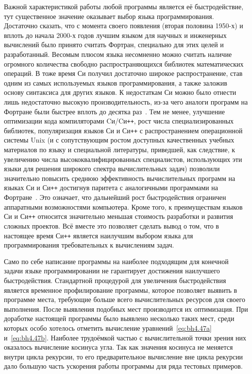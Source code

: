 Важной характеристикой работы любой программы является её
быстродействие, тут существенное значение оказывает выбор языка
программирования.  Достаточно сказать, что с момента своего появления
(вторая половина 1950-х) и вплоть до начала 2000-х годов лучшим языком
для научных и инженерных вычислений было принято считать Фортран,
специально для этих целей и разработанный. Весомым плюсом языка
несомненно можно считать наличие огромного количества свободно
распространяющихся библиотек математических операций. В тоже время Си
получил достаточно широкое распространение, став одним из самых
используемых языков программирования, а также заложив основу
синтаксиса для других языков. К недостаткам Си можно было отнести лишь
недостаточно высокую производительность, из-за чего аналоги программ
на Фортране были быстрее вплоть до десятка
раз~\cite{Veldhuizen-1997}. Тем не менее, улучшение оптимизации кода
компиляторами Cи/Cи\texttt{++}, рост числа специализированных
библиотек, популяризация языков Си и Си\texttt{++} с распространением
операционной системы Unix (и с сопутствующим ростом доступных
качественных учебных материалов по языку и специальной литературы,
приведшей, как следствие, к увеличению числа высококвалифицированных
специалистов, использующих эти языки для решения широкого спектра
вычислительных задач) позволили значительно повысить среднюю
эффективность вычислительных программ на языках Си и Си\texttt{++}
достигнув паритета с аналогичными программами на
Фортране~\cite{Veldhuizen-1997,Markovich-FDTD-2013}.  Это означает,
что дальнейший рост быстродействия ограничен аппаратными возможностями
компьютера.  Кроме того, к преимуществам языков Си и Си\texttt{++}
относится значительно меньшая стоимость разработки и развития сложных
проектов.  Всё вместе это позволяет сделать вывод о том, что в
настоящее время Си\texttt{++} является наилучшим выбором языка для
программирования требовательных к вычислениям задач.

Само по себе написание программы на наиболее подходящим для конечной
задачи языке программировании не гарантирует достижения наилучшего
быстродействия.  Стандартной процедурой для увеличения быстродействия
является временное профилирование программы, которое позволяет выявить
в программе места, требующие больше всего вычислительных ресурсов для
своего выполнения.  После выявления подобных мест производится их
оптимизация.  При доработке настоящей программы было выявлено
несколько таких мест, среди которых особо хотелось отметить вычисление
уравнений~\ref{eq:bh4.47a} и~\ref{eq:bh4.47b}.  Наиболее трудоёмкой
частью с вычислительной точки зрения них оказалось вычисление косинуса
угла. Так как значения косинуса не меняется внутри цикла рекурсии, то
его предварительное вычисление вне цикла рекурсии дало большую часть
ускорения работы программы для ряда тестовых примеров.

